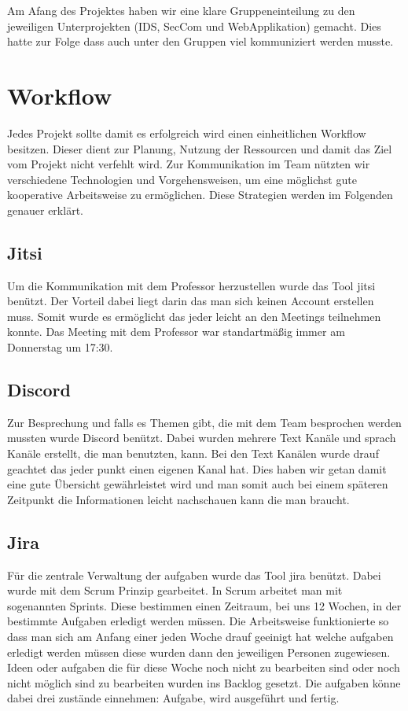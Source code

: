 \documentclass[letterpaper,10pt,ngerman]{sphinxmanual}
\begin{document}
Am Afang des Projektes haben wir eine klare Gruppeneinteilung zu den jeweiligen Unterprojekten (IDS, SecCom und Web\sphinxhyphen{}Applikation) gemacht. Dies hatte zur Folge dass auch unter den Gruppen viel kommuniziert werden musste.


\section{Workflow}
\label{\detokenize{kommunikation:workflow}}\label{\detokenize{kommunikation::doc}}
Jedes Projekt sollte damit es erfolgreich wird einen einheitlichen Workflow besitzen.
Dieser dient zur Planung, Nutzung der Ressourcen und damit das Ziel vom Projekt nicht
verfehlt wird. Zur Kommunikation im Team nützten wir verschiedene Technologien und
Vorgehensweisen, um eine möglichst gute kooperative Arbeitsweise zu ermöglichen.
Diese Strategien werden im Folgenden genauer erklärt.


\subsection{Jitsi}
\label{\detokenize{kommunikation:jitsi}}
Um die Kommunikation mit dem Professor herzustellen wurde das Tool jitsi benützt.
Der Vorteil dabei liegt darin das man sich keinen Account erstellen muss.
Somit wurde es ermöglicht das jeder leicht an den Meetings teilnehmen konnte.
Das Meeting mit dem Professor war standartmäßig immer am Donnerstag um 17:30.


\subsection{Discord}
\label{\detokenize{kommunikation:discord}}
Zur Besprechung und falls es Themen gibt, die mit dem Team besprochen werden mussten
wurde Discord benützt. Dabei wurden mehrere Text Kanäle und sprach Kanäle erstellt,
die man benutzten, kann. Bei den Text Kanälen wurde drauf geachtet das jeder punkt
einen eigenen Kanal hat. Dies haben wir getan damit eine gute Übersicht gewährleistet
wird und man somit auch bei einem späteren Zeitpunkt die Informationen leicht nachschauen
kann die man braucht.

\noindent{}


\subsection{Jira}
\label{\detokenize{kommunikation:jira}}
Für die zentrale Verwaltung der aufgaben wurde das Tool jira benützt. Dabei wurde mit
dem Scrum Prinzip gearbeitet. In Scrum arbeitet man mit sogenannten Sprints. Diese
bestimmen einen Zeitraum, bei uns 1\sphinxhyphen{}2 Wochen, in der bestimmte Aufgaben erledigt
werden müssen. Die Arbeitsweise funktionierte so dass man sich am Anfang einer jeden
Woche drauf geeinigt hat welche aufgaben erledigt werden müssen diese wurden dann den
jeweiligen Personen zugewiesen. Ideen oder aufgaben die für diese Woche noch nicht zu
bearbeiten sind oder noch nicht möglich sind zu bearbeiten wurden ins Backlog gesetzt.
Die aufgaben könne dabei drei zustände einnehmen: Aufgabe, wird ausgeführt und fertig.
\end{document}

